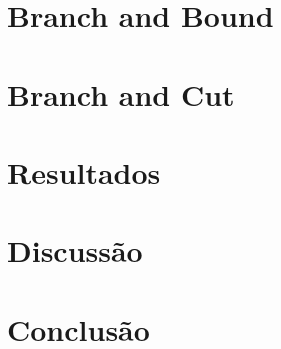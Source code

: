 \documentclass{article}
\begin{document}
	\section{Branch and Bound}
	
	\section{Branch and Cut}
	
	\section{Resultados}
	
	\section{Discussão}
	
	\section{Conclusão}

	
\end{document}
